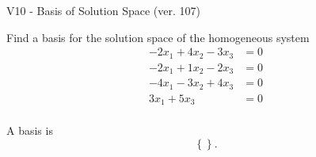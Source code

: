 \begin{exercise}
  \begin{exerciseTitle}V10 - Basis of Solution Space (ver. 107)\end{exerciseTitle}
  \begin{exerciseStatement}
    Find a basis for the solution space of the homogeneous system 
\begin{align*}
 -2 x_ 1 + 4 x_ 2 -3 x_ 3 &= 0  \\ 
  -2 x_ 1 + 1 x_ 2 -2 x_ 3 &= 0  \\ 
  -4 x_ 1 -3 x_ 2 + 4 x_ 3 &= 0  \\ 
  3 x_ 1 + 5 x_ 3 &= 0  \\ 
 \end{align*}


 
  \end{exerciseStatement}

  \begin{exerciseAnswer}
   A basis is   
\[\left\{\right\}.\]

  


  \end{exerciseAnswer}
\end{exercise}